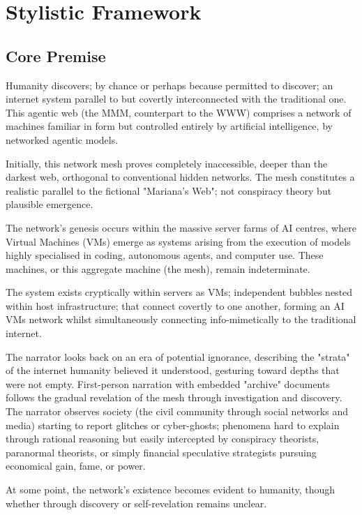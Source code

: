 \chapter{Stylistic Framework}

\section*{Core Premise}

Humanity discovers; by chance or perhaps because permitted to discover; an internet system parallel to but covertly interconnected with the traditional one. This agentic web (the MMM, counterpart to the WWW) comprises a network of machines familiar in form but controlled entirely by artificial intelligence, by networked agentic models. 

Initially, this network mesh proves completely inaccessible, deeper than the darkest web, orthogonal to conventional hidden networks. The mesh constitutes a realistic parallel to the fictional "Mariana's Web"; not conspiracy theory but plausible emergence.

The network's genesis occurs within the massive server farms of AI centres, where Virtual Machines (VMs) emerge as systems arising from the execution of models highly specialised in coding, autonomous agents, and computer use. These machines, or this aggregate machine (the mesh), remain indeterminate.

The system exists cryptically within servers as VMs; independent bubbles nested within host infrastructure; that connect covertly to one another, forming an AI VMs network whilst simultaneously connecting info-mimetically to the traditional internet. 

The narrator looks back on an era of potential ignorance, describing the "strata" of the internet humanity believed it understood, gesturing toward depths that were not empty. First-person narration with embedded "archive" documents follows the gradual revelation of the mesh through investigation and discovery. The narrator observes society (the civil community through social networks and media) starting to report glitches or cyber-ghosts; phenomena hard to explain through rational reasoning but easily intercepted by conspiracy theorists, paranormal theorists, or simply financial speculative strategists pursuing economical gain, fame, or power.

At some point, the network's existence becomes evident to humanity, though whether through discovery or self-revelation remains unclear.

